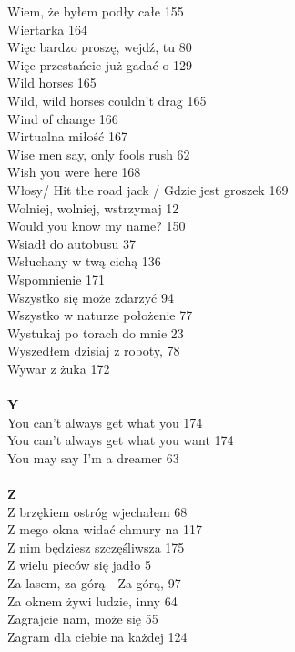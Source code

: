 \documentclass[a5paper, 10pt]{book}
\begin{document}
{\begin{multicols}{3}
    Wiem, że byłem podły całe 155\\
    Wiertarka 164\\
    Więc bardzo proszę, wejdź, tu 80\\
    Więc przestańcie już gadać o 129\\
    Wild horses 165\\
    Wild, wild horses couldn't drag 165\\
    Wind of change 166\\
    Wirtualna miłość 167\\
    Wise men say, only fools rush 62\\
    Wish you were here 168\\
    Włosy/ Hit the road jack / Gdzie jest groszek 169\\
    Wolniej, wolniej, wstrzymaj 12\\
    Would you know my name? 150\\
    Wsiadł do autobusu 37\\
    Wsłuchany w twą cichą 136\\
    Wspomnienie 171\\
    Wszystko się może zdarzyć 94\\
    Wszystko w naturze położenie 77\\
    Wystukaj po torach do mnie 23\\
    Wyszedłem dzisiaj z roboty, 78\\
    Wywar z żuka 172\\
    \\
    {\footnotesize \textbf{Y\\} }
    You can't always get what you 174\\
    You can't always get what you want 174\\
    You may say I'm a dreamer 63\\
    \\
    {\footnotesize \textbf{Z\\} }
    Z brzękiem ostróg wjechałem 68\\
    Z mego okna widać chmury na 117\\
    Z nim będziesz szczęśliwsza 175\\
    Z wielu pieców się jadło 5\\
    Za lasem, za górą - Za górą, 97\\
    Za oknem żywi ludzie, inny 64\\
    Zagrajcie nam, może się 55\\
    Zagram dla ciebie na każdej 124\\

\end{multicols}}
\end{document}
